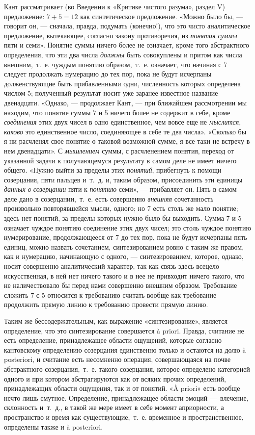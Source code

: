 Кант рассматривает (во Введении к «Критике чистого разума», раздел V)
предложение: $7 + 5 = 12$ как синтетическое предложение. «Можно было бы, —
говорит он, — сначала, правда, подумать (конечно!), что это чисто
аналитическое предложение, вытекающее, согласно закону противоречия, из
{\em понятия суммы} пяти и семи». Понятие суммы ничего
более не означает, кроме того абстрактного определения, что эти два числа
{\em должны} быть совокуплены и притом как числа
внешним,~т.~е. чуждым понятию образом,~т.~е. означает, что начиная с 7
следует продолжать нумерацию до тех пор, пока не будут исчерпаны
долженствующие быть прибавленными одни, численность которых определена
числом 5; полученный результат носит уже заранее известное название
двенадцати. «Однако, — продолжает Кант, — при ближайшем рассмотрении мы
находим, что понятие суммы 7 и 5 ничего более не содержит в себе, кроме
{\em соединения} этих двух чисел в одно единственное,
чем вовсе еще не {\em мыслится},
{\em каково} это единственное число, соединяющее в себе
те два числа». «Сколько бы я ни расчленял свое понятие о таковой возможной
сумме, я все-таки не встречу в нем двенадцати». С
{\em мышлением} суммы, с расчленением понятия, переход
от указанной задачи к получающемуся результату в самом деле не имеет ничего
общего. «Нужно выйти за пределы этих {\em понятий},
прибегнуть к помощи созерцания, пяти пальцев и~т.~д. и, таким образом,
присоединить эти единицы {\em данных в созерцании} пяти
к {\em понятию} семи», — прибавляет он. Пять в самом
деле дано в созерцании,~т.~е. есть совершенно
{\em внешняя} сочетанность произвольно повторявшейся
мысли, одного; но 7 есть столь же мало понятие; здесь нет понятий, за
пределы которых нужно было бы выходить. Сумма 7 и 5 означает чуждое понятию
соединение этих двух чисел; это столь чуждое понятию нумерирование,
продолжающееся от 7 до тех пор, пока не будут исчерпаны пять единиц, можно
назвать сочетанием, синтезированием ровно с таким же правом, как и
нумерацию, начинающую с одного, — синтезированием, которое, однако, носит
совершенно аналитический характер, так как связь здесь всецело
искусственная, в ней нет ничего такого и в нее не привходит ничего такого,
что не наличествовало бы перед нами совершенно внешним образом. Требование
сложить 7 с 5 относится к требованию считать вообще как требование
продолжить прямую линию к требованию провести прямую линию.

Таким же бессодержательным, как выражение «синтезирование», является
определение, что это синтезирование совершается à priori. Правда, считание
не есть определение, принадлежащее области ощущений, которые согласно
кантовскому определению созерцания единственно только и остаются на долю à
posteriori, и считание есть несомненно операция, совершающаяся на почве
абстрактного созерцания,~т.~е. такого созерцания, которое определено
категорией одного и при котором абстрагируются как от всяких прочих
определений, принадлежащих области ощущения, так и от понятий. «À priori»
есть вообще нечто лишь смутное. Определение, принадлежащее области эмоций
—~влечение, склонность и~т.~д., в такой же мере имеет в себе момент
априорности, а пространство и время как существующие,~т.~е. временное и
пространственное, определены также и à posteriori.

